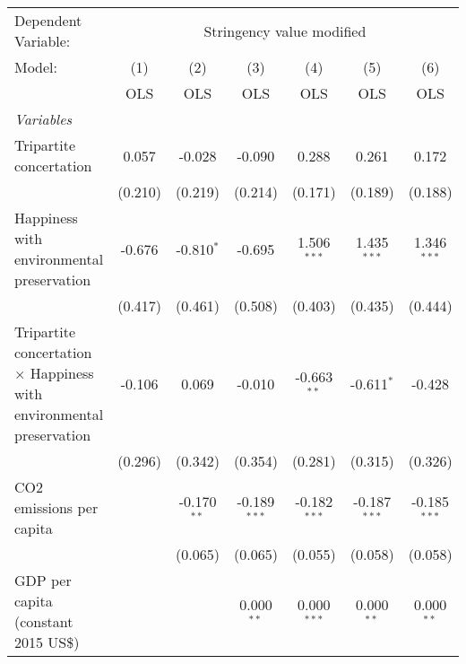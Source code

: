 
\begingroup
\centering
\begin{tabular}{lcccccc}
   \toprule
   Dependent Variable: & \multicolumn{6}{c}{Stringency value modified}\\
   Model:                                                                      & (1)     & (2)           & (3)            & (4)            & (5)            & (6)\\  
                                                                               &  OLS    & OLS           & OLS            & OLS            & OLS            & OLS\\  
   \midrule
   \emph{Variables}\\
   Tripartite concertation                                                     & 0.057   & -0.028        & -0.090         & 0.288          & 0.261          & 0.172\\   
                                                                               & (0.210) & (0.219)       & (0.214)        & (0.171)        & (0.189)        & (0.188)\\   
   Happiness with environmental preservation                                   & -0.676  & -0.810$^{*}$  & -0.695         & 1.506$^{***}$  & 1.435$^{***}$  & 1.346$^{***}$\\   
                                                                               & (0.417) & (0.461)       & (0.508)        & (0.403)        & (0.435)        & (0.444)\\   
   Tripartite concertation $\times$ Happiness with environmental preservation  & -0.106  & 0.069         & -0.010         & -0.663$^{**}$  & -0.611$^{*}$   & -0.428\\   
                                                                               & (0.296) & (0.342)       & (0.354)        & (0.281)        & (0.315)        & (0.326)\\   
   CO2 emissions per capita                                                    &         & -0.170$^{**}$ & -0.189$^{***}$ & -0.182$^{***}$ & -0.187$^{***}$ & -0.185$^{***}$\\   
                                                                               &         & (0.065)       & (0.065)        & (0.055)        & (0.058)        & (0.058)\\   
   GDP per capita (constant 2015 US\$)                                         &         &               & 0.000$^{**}$   & 0.000$^{***}$  & 0.000$^{**}$   & 0.000$^{**}$\\   

\end{tabular}
